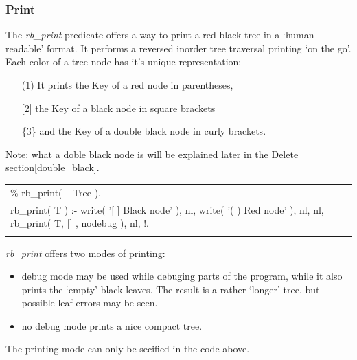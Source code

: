 \documentclass{article}
\newenvironment{code}{\obeycr\begin{it}\nopagebreak\addvspace{1ex}\noindent\footnotesize\begin{tabular}{|p{0.95\textwidth}|}\hline}{\\\hline\end{tabular}\par\addvspace{1ex}\end{it}\restorecr}
\newcommand{\inlinecode}[1]{\textit{#1}}
\begin{document}
\subsubsection{Print}
The \inlinecode{rb\_print} predicate offers a way to print a red-black tree in a `human readable' format. It performs a reversed inorder tree traversal printing `on the go'.
Each color of a tree node has it's unique representation:
\begin{itemize}
\item[(1)]It prints the Key of a red node in parentheses, 
\item[{[2]}]the Key of a black node in square brackets 
\item[\{3\}]and the Key of a double black node in curly brackets.
\end{itemize}
\nopagebreak
Note: what a doble black node is will be explained later in the Delete section\ref{double_black}.

\begin{code}
\% rb\_print( +Tree ).\\
rb\_print( T ) :-
\hspace{2ex}write( '[ ] Black node' ), nl, 
\hspace{2ex}write( '( ) Red node' ), nl, nl,
\hspace{2ex}rb\_print( T, [] , nodebug ), nl, !.\\
\end{code}

\inlinecode{rb\_print} offers two modes of printing:
\begin{itemize}
\item{debug} mode may be used while debuging parts of the program, while it also prints the `empty' black leaves. The result is a rather `longer' tree, but possible leaf errors may be seen.
\item{no debug} mode prints a nice compact tree.
\end{itemize}
The printing mode can only be secified in the code above.
\end{document}
